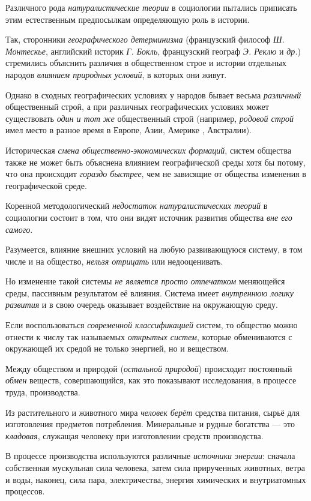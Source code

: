 \documentclass[a4paper,14pt,russian]{extreport}
\begin{document}
Различного рода \emph{натуралистические теории} в социологии пытались приписать этим естественным предпосылкам определяющую роль в истории.

Так, сторонники \emph{географического детерминизма} (французский философ \emph{Ш. Монтескье}, английский историк \emph{Г. Бокль}, французский географ \emph{Э. Реклю} и \emph{др.}) стремились объяснить различия в общественном строе и истории отдельных народов \emph{влиянием природных условий}, в которых они живут.

Однако в сходных географических условиях у народов бывает весьма \emph{различный} общественный строй, а при различных географических условиях может существовать \emph{один и тот же} общественный строй (например, \emph{родовой строй} имел место в разное время в Европе, Азии, Америке , Австралии).

Историческая \emph{смена общественно-экономических формаций}, систем общества также не может быть объяснена влиянием географической среды хотя бы потому, что она происходит \emph{гораздо быстрее}, чем не зависящие от общества изменения в географической среде.

Коренной методологический \emph{недостаток натуралистических теорий} в социологии состоит в том, что они видят источник развития общества \emph{вне его самого}.

Разумеется, влияние внешних условий на любую развивающуюся систему, в том числе и на общество, \emph{нельзя отрицать} или недооценивать.

Но изменение такой системы \emph{не является просто отпечатком} меняющейся среды, пассивным результатом её влияния. Система имеет \emph{внутреннюю логику развития} и в свою очередь оказывает воздействие на окружающую среду.

Если воспользоваться \emph{современной классификацией} систем, то общество можно отнести к числу так называемых \emph{открытых систем}, которые обмениваются с окружающей их средой не только энергией, но и веществом.

Между обществом и природой (\emph{остальной природой}) происходит постоянный \emph{обмен} веществ, совершающийся, как это показывают исследования, в процессе труда, производства.

Из растительного и животного мира \emph{человек берёт} средства питания, сырьё для изготовления предметов потребления. Минеральные и рудные богатства --- это \emph{кладовая}, служащая человеку при изготовлении средств производства.

В процессе производства используются различные \emph{источники энергии}: сначала собственная мускульная сила человека, затем сила прирученных животных, ветра и воды, наконец, сила пара, электричества, энергия химических и внутриатомных процессов.
\end{document}
